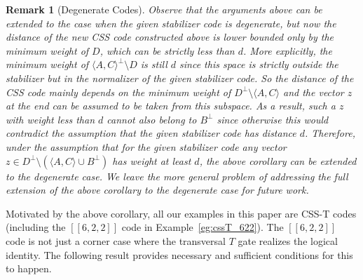 \documentclass[twoside,romanappendices]{IEEEtran}
\newtheorem{remark}[theorem]{Remark}
\newcommand{\llbr}{[\![}
\newcommand{\rrbr}{]\!]}
\begin{document}
\begin{remark}[Degenerate Codes]
\normalfont
Observe that the arguments above can be extended to the case when the given stabilizer code is degenerate, but now the distance of the new CSS code constructed above is lower bounded only by the minimum weight of $D$, which can be strictly less than $d$.
More explicitly, the minimum weight of $\langle A,C \rangle^{\perp} \setminus D$ is still $d$ since this space is strictly outside the stabilizer but in the normalizer of the given stabilizer code.
So the distance of the CSS code mainly depends on the minimum weight of $D^{\perp} \setminus \langle A,C \rangle$ and the vector $z$ at the end can be assumed to be taken from this subspace.
As a result, such a $z$ with weight less than $d$ cannot also belong to $B^{\perp}$ since otherwise this would contradict the assumption that the given stabilizer code has distance $d$.
Therefore, under the assumption that for the given stabilizer code any vector $z \in D^{\perp} \setminus (\langle A,C \rangle \cup B^{\perp})$ has weight at least $d$, the above corollary can be extended to the degenerate case.
We leave the more general problem of addressing the full extension of the above corollary to the degenerate case for future work.
\end{remark}

Motivated by the above corollary, all our examples in this paper are CSS-T codes (including the $\llbr 6,2,2 \rrbr$ code in Example~\ref{eg:cssT_622}).
The $\llbr 6,2,2 \rrbr$ code is not just a corner case where the transversal $T$ gate realizes the logical identity.
The following result provides necessary and sufficient conditions for this to happen.
\end{document}
